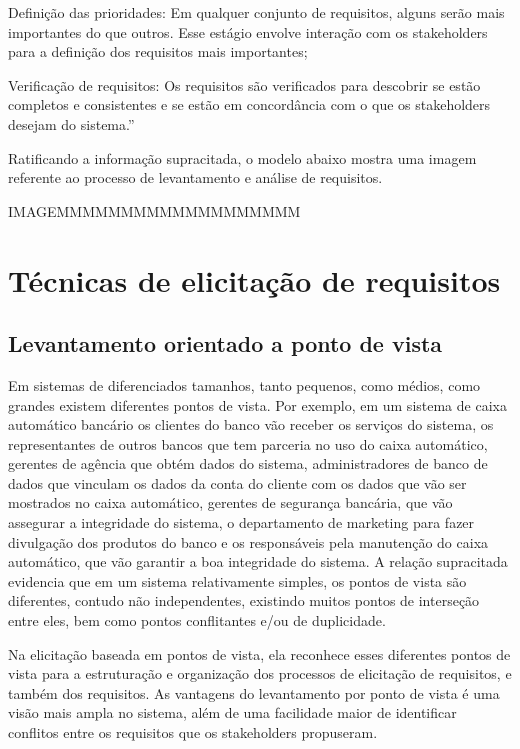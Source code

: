 Definição das prioridades: Em qualquer conjunto de requisitos, alguns serão mais importantes do que outros. Esse estágio envolve interação com os stakeholders para a definição dos requisitos mais importantes;

Verificação de requisitos: Os requisitos são verificados para descobrir se estão completos e consistentes e se estão em concordância com o que os stakeholders desejam do sistema.”

Ratificando a informação supracitada, o modelo abaixo mostra uma imagem referente ao processo de levantamento e análise de requisitos.

IMAGEMMMMMMMMMMMMMMMMMMM

\section {Técnicas de elicitação de requisitos}

\subsection {Levantamento orientado a ponto de vista}

Em sistemas de diferenciados tamanhos, tanto pequenos, como médios, como grandes existem diferentes pontos de vista. Por exemplo, em um sistema de caixa automático bancário os clientes do banco vão receber os serviços do sistema, os representantes de outros bancos que tem parceria no uso do caixa automático, gerentes de agência que obtém dados do sistema, administradores de banco de dados que vinculam os dados da conta do cliente com os dados que vão ser mostrados no caixa automático, gerentes de segurança bancária, que vão assegurar a integridade do sistema, o departamento de marketing para fazer divulgação dos produtos do banco e os responsáveis pela manutenção do caixa automático, que vão garantir a boa integridade do sistema. A relação supracitada evidencia que em um sistema relativamente simples, os pontos de vista são diferentes, contudo não independentes, existindo muitos pontos de interseção entre eles, bem como pontos conflitantes e/ou de duplicidade.

Na elicitação baseada em pontos de vista, ela reconhece esses diferentes pontos de vista para a estruturação e organização dos processos de elicitação de requisitos, e também dos requisitos. As vantagens do levantamento por ponto de vista é uma visão mais ampla no sistema, além de uma facilidade maior de identificar conflitos entre os requisitos que os stakeholders propuseram.

